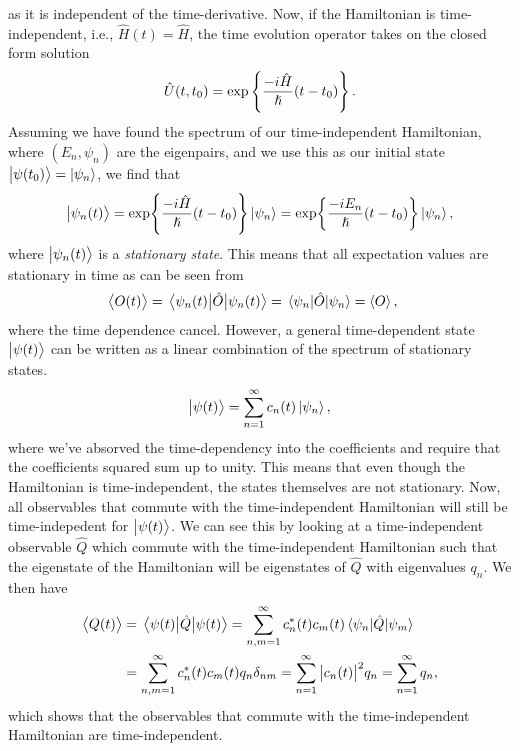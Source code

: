         as it is independent of the time-derivative.
        Now, if the Hamiltonian is time-independent, i.e., $\hat{H}(t) =
        \hat{H}$, the time evolution operator takes on the closed form solution
        \begin{align}
            \hat{U}(t, t_0) = \exp\left\{ 
                \frac{-i \hat{H}}{\hslash} (t - t_0)
             \right\}.
            \label{eq:ti-evolution}
        \end{align}
        Assuming we have found the spectrum of our time-independent Hamiltonian,
        where $(E_n, \psi_n)$ are the eigenpairs, and we use this as our initial
        state $\ket{\psi(t_0)} = \ket{\psi_n}$, we find that
        \begin{gather}
            \ket{\psi_n(t)}
            = \exp{\frac{-i\hat{H}}{\hslash}(t - t_0)}\ket{\psi_n}
            = \exp{\frac{-i E_n}{\hslash} (t - t_0)}\ket{\psi_n},
        \end{gather}
        where $\ket{\psi_n(t)}$ is a \emph{stationary state}.
        This means that all expectation values are stationary in time as can be
        seen from
        \begin{align}
            \left\langle O(t) \right\rangle
            &= \mel{\psi_n(t)}{\hat{O}}{\psi_n(t)}
            = \mel{\psi_n}{\hat{O}}{\psi_n}
            = \left\langle O \right\rangle,
        \end{align}
        where the time dependence cancel.
        However, a general time-dependent state $\ket{\psi(t)}$ can be written
        as a linear combination of the spectrum of stationary states.
        \begin{align}
            \ket{\psi(t)} = \sum_{n = 1}^{\infty}c_n(t)\ket{\psi_n},
        \end{align}
        where we've absorved the time-dependency into the coefficients and
        require that the coefficients squared sum up to unity.
        This means that even though the Hamiltonian is time-independent, the
        states themselves are not stationary.
        Now, all observables that commute with the time-independent Hamiltonian
        will still be time-indepedent for $\ket{\psi(t)}$.
        We can see this by looking at a time-independent observable $\hat{Q}$
        which commute with the time-independent Hamiltonian such that the
        eigenstate of the Hamiltonian will be eigenstates of $\hat{Q}$ with
        eigenvalues $q_n$.
        We then have
        \begin{align}
            \left\langle Q(t) \right\rangle
            &= \mel{\psi(t)}{\hat{Q}}{\psi(t)}
            = \sum_{n, m = 1}^{\infty} c^{*}_n(t) c_m(t)
            \mel{\psi_n}{\hat{Q}}{\psi_m}
            \\
            &= \sum_{n, m = 1}^{\infty}
            c^{*}_n(t) c_m(t) q_n \delta_{nm}
            = \sum_{n = 1}^{\infty}
            \abs{c_n(t)}^2 q_n
            = \sum_{n = 1}^{\infty}
            q_n,
        \end{align}
        which shows that the observables that commute with the time-independent
        Hamiltonian are time-independent.


